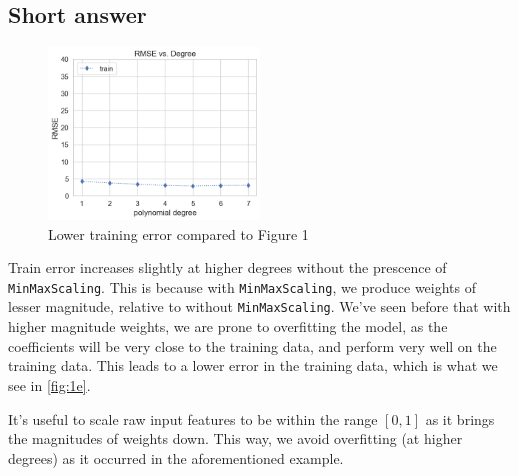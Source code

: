 \documentclass[12pt]{article}
\begin{document}
\subsection{Short answer}

\renewcommand{\thefigure}{1.1}
\begin{figure}[htbp]
    \centering
    \includegraphics[width=0.5\textwidth]{1e.png}
    \caption{Lower training error compared to Figure 1}
    \label{fig:1e}
\end{figure}
\renewcommand{\thefigure}{\arabic{figure}} 
\setcounter{figure}{1}

Train error increases slightly at higher degrees without the prescence of
\verb|MinMaxScaling|. This is because with \verb|MinMaxScaling|, we produce
weights of lesser magnitude, relative to without \verb|MinMaxScaling|. We've
seen before that with higher magnitude weights, we are prone to overfitting the
model, as the coefficients will be very close to the training data, and perform
very well on the training data. This leads to a lower error in the training
data, which is what we see in \autoref{fig:1e}. 

It's useful to scale raw input features to be within the range $[0,1]$ as it
brings the magnitudes of weights down. This way, we avoid overfitting (at
higher degrees) as it
occurred in the aforementioned example. 

\pagebreak

\section{}
\end{document}
